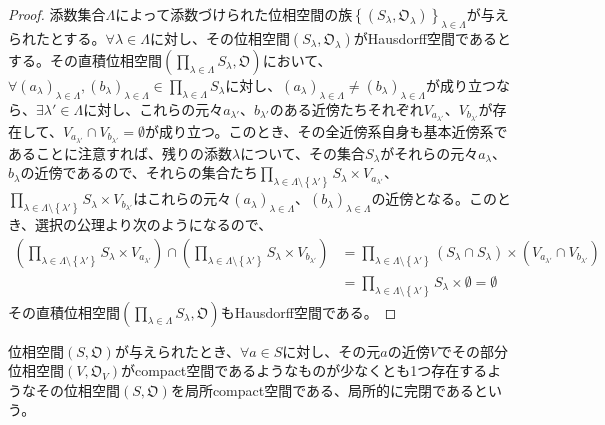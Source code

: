 \documentclass[dvipdfmx]{jsarticle}
\begin{document}
\begin{proof}
添数集合$\varLambda$によって添数づけられた位相空間の族$\left\{ \left( S_{\lambda},\mathfrak{O}_{\lambda} \right) \right\}_{\lambda \in \varLambda}$が与えられたとする。$\forall\lambda \in \varLambda$に対し、その位相空間$\left( S_{\lambda},\mathfrak{O}_{\lambda} \right)$がHausdorff空間であるとする。その直積位相空間$\left( \prod_{\lambda \in \varLambda} S_{\lambda},\mathfrak{O} \right)$において、$\forall\left( a_{\lambda} \right)_{\lambda \in \varLambda},\left( b_{\lambda} \right)_{\lambda \in \varLambda} \in \prod_{\lambda \in \varLambda} S_{\lambda}$に対し、$\left( a_{\lambda} \right)_{\lambda \in \varLambda} \neq \left( b_{\lambda} \right)_{\lambda \in \varLambda}$が成り立つなら、$\exists\lambda' \in \varLambda$に対し、これらの元々$a_{\lambda'}$、$b_{\lambda'}$のある近傍たちそれぞれ$V_{a_{\lambda'}}$、$V_{b_{\lambda'}}$が存在して、$V_{a_{\lambda'}} \cap V_{b_{\lambda'}} = \emptyset$が成り立つ。このとき、その全近傍系自身も基本近傍系であることに注意すれば、残りの添数$\lambda$について、その集合$S_{\lambda}$がそれらの元々$a_{\lambda}$、$b_{\lambda}$の近傍であるので、それらの集合たち$\prod_{\lambda \in \varLambda \setminus \left\{ \lambda' \right\}} S_{\lambda} \times V_{a_{\lambda'}}$、$\prod_{\lambda \in \varLambda \setminus \left\{ \lambda' \right\}} S_{\lambda} \times V_{b_{\lambda'}}$はこれらの元々$\left( a_{\lambda} \right)_{\lambda \in \varLambda}$、$\left( b_{\lambda} \right)_{\lambda \in \varLambda}$の近傍となる。このとき、選択の公理より次のようになるので、
\begin{align*}
\left( \prod_{\lambda \in \varLambda \setminus \left\{ \lambda' \right\}} S_{\lambda} \times V_{a_{\lambda'}} \right) \cap \left( \prod_{\lambda \in \varLambda \setminus \left\{ \lambda' \right\}} S_{\lambda} \times V_{b_{\lambda'}} \right) &= \prod_{\lambda \in \varLambda \setminus \left\{ \lambda' \right\}} \left( S_{\lambda} \cap S_{\lambda} \right) \times \left( V_{a_{\lambda'}} \cap V_{b_{\lambda'}} \right)\\
&= \prod_{\lambda \in \varLambda \setminus \left\{ \lambda' \right\}} S_{\lambda} \times \emptyset = \emptyset
\end{align*}
その直積位相空間$\left( \prod_{\lambda \in \varLambda} S_{\lambda},\mathfrak{O} \right)$もHausdorff空間である。
\end{proof}
\begin{dfn}
位相空間$\left( S,\mathfrak{O} \right)$が与えられたとき、$\forall a \in S$に対し、その元$a$の近傍$V$でその部分位相空間$\left( V,\mathfrak{O}_{V} \right)$がcompact空間であるようなものが少なくとも1つ存在するようなその位相空間$\left( S,\mathfrak{O} \right)$を局所compact空間である、局所的に完閉であるという。
\end{dfn}
\end{document}
